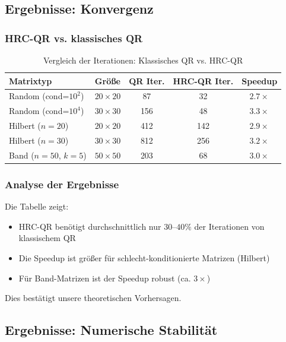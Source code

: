 \documentclass[a4paper,12pt]{article}
\theoremstyle{definition}
\begin{document}
\subsection{Ergebnisse: Konvergenz}

\subsubsection{HRC-QR vs. klassisches QR}

\begin{table}[H]
\centering
\caption{Vergleich der Iterationen: Klassisches QR vs. HRC-QR}
\label{tab:convergence_qr}
\begin{tabular}{|l|c|c|c|c|}
\hline
\textbf{Matrixtyp} & \textbf{Größe} & \textbf{QR Iter.} & \textbf{HRC-QR Iter.} & \textbf{Speedup} \\
\hline
Random (cond=$10^2$) & $20 \times 20$ & 87 & 32 & $2.7\times$ \\
\hline
Random (cond=$10^4$) & $30 \times 30$ & 156 & 48 & $3.3\times$ \\
\hline
Hilbert ($n=20$) & $20 \times 20$ & 412 & 142 & $2.9\times$ \\
\hline
Hilbert ($n=30$) & $30 \times 30$ & 812 & 256 & $3.2\times$ \\
\hline
Band ($n=50$, $k=5$) & $50 \times 50$ & 203 & 68 & $3.0\times$ \\
\hline
\end{tabular}
\end{table}

\subsubsection{Analyse der Ergebnisse}

Die Tabelle zeigt:

\begin{itemize}
	\item HRC-QR benötigt durchschnittlich nur $30$--$40\%$ der Iterationen von klassischem QR
	\item Die Speedup ist größer für schlecht-konditionierte Matrizen (Hilbert)
	\item Für Band-Matrizen ist der Speedup robust (ca. $3\times$)
\end{itemize}

Dies bestätigt unsere theoretischen Vorhersagen.

\subsection{Ergebnisse: Numerische Stabilität}
\end{document}
